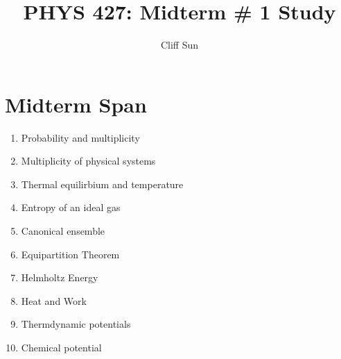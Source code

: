 \documentclass{article}
\title{PHYS 427: Midterm \# 1 Study}
\author{Cliff Sun}
\newtheorem{one minute paper}[theorem]{One Minute Paper}
\begin{document}
\maketitle

\section*{Midterm Span}
\begin{enumerate}
    \item Probability and multiplicity
    \item Multiplicity of physical systems
    \item Thermal equilirbium and temperature
    \item Entropy of an ideal gas
    \item Canonical ensemble
    \item Equipartition Theorem
    \item Helmholtz Energy
    \item Heat and Work
    \item Thermdynamic potentials
    \item Chemical potential
\end{enumerate}
\end{document}
